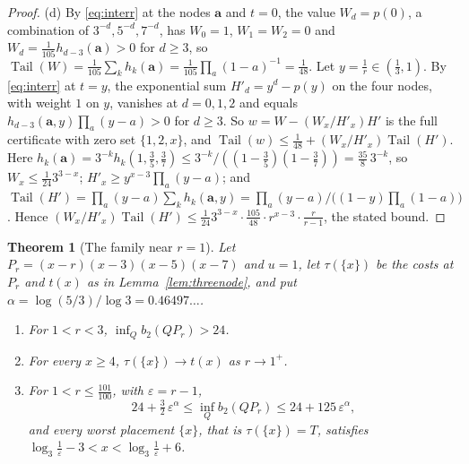 \documentclass[11pt]{article}
\newtheorem{theorem}{Theorem}[section]
\DeclareMathOperator{\Tail}{Tail}
\begin{document}
\begin{proof}
(d) By \eqref{eq:interr} at the nodes $\mathbf a$ and $t=0$, the value
$W_d=p(0)$, a combination of $3^{-d},5^{-d},7^{-d}$, has $W_0=1$,
$W_1=W_2=0$ and $W_d=\tfrac1{105}h_{d-3}(\mathbf a)>0$ for $d\ge3$, so
$\Tail(W)=\tfrac1{105}\sum_kh_k(\mathbf a)=\tfrac1{105}\prod_a(1-a)^{-1}=\tfrac1{48}$.
Let $y=\tfrac1r\in(\tfrac13,1)$.  By \eqref{eq:interr} at $t=y$, the
exponential sum $H'_d=y^d-p(y)$ on the four nodes, with weight $1$ on $y$,
vanishes at $d=0,1,2$ and equals
$h_{d-3}(\mathbf a,y)\prod_a(y-a)>0$ for $d\ge3$.  So
$w=W-(W_x/H'_x)H'$ is the full certificate with zero set $\{1,2,x\}$, and
$\Tail(w)\le\tfrac1{48}+(W_x/H'_x)\Tail(H')$.  Here
$h_k(\mathbf a)=3^{-k}h_k(1,\tfrac35,\tfrac37)\le3^{-k}/((1-\tfrac35)(1-\tfrac37))=\tfrac{35}8\,3^{-k}$,
so $W_x\le\tfrac1{24}3^{3-x}$; $H'_x\ge y^{x-3}\prod_a(y-a)$; and
$\Tail(H')=\prod_a(y-a)\sum_kh_k(\mathbf a,y)
=\prod_a(y-a)/\bigl((1-y)\prod_a(1-a)\bigr)$.  Hence
$(W_x/H'_x)\Tail(H')\le\tfrac1{24}3^{3-x}\cdot\tfrac{105}{48}\cdot
r^{x-3}\cdot\tfrac r{r-1}$, the stated bound.
\end{proof}

\begin{theorem}[The family near $r=1$]\label{thm:familyone}
Let $P_r=(x-r)(x-3)(x-5)(x-7)$ and $u=1$, let $\tau(\{x\})$ be the costs at
$P_r$ and $t(x)$ as in Lemma~\ref{lem:threenode}, and put
$\alpha=\log(5/3)/\log3=0.46497\ldots$.
\begin{enumerate}
\item[(a)] For $1<r<3$, $\inf_Qb_2(QP_r)>24$.
\item[(b)] For every $x\ge4$, $\tau(\{x\})\to t(x)$ as $r\to1^+$.
\item[(c)] For $1<r\le\tfrac{101}{100}$, with $\varepsilon=r-1$,
\[
  24+\tfrac32\,\varepsilon^\alpha\le\inf_Qb_2(QP_r)\le24+125\,\varepsilon^\alpha,
\]
and every worst placement $\{x\}$, that is $\tau(\{x\})=T$, satisfies
$\log_3\frac1\varepsilon-3<x<\log_3\frac1\varepsilon+6$.
\end{enumerate}
\end{theorem}
\end{document}
